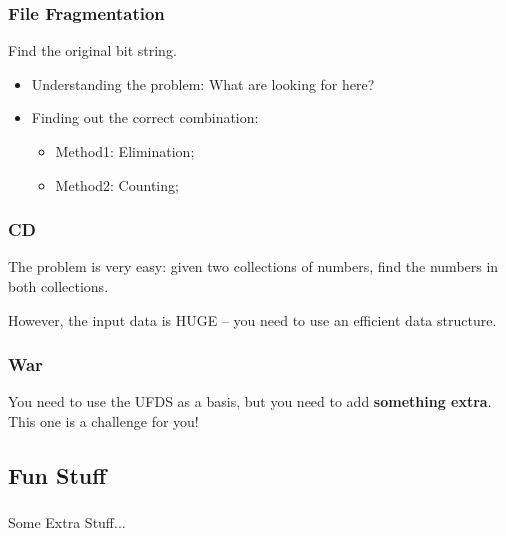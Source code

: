 \documentclass{beamer}
\begin{document}
\begin{frame}
  \frametitle{File Fragmentation}
  Find the original bit string.
  \begin{itemize}
  \item Understanding the problem: What are looking for here?
  \item Finding out the correct combination:
    \begin{itemize}
    \item Method1: Elimination;
    \item Method2: Counting;
    \end{itemize}
  \end{itemize}
\end{frame}

\begin{frame}
  \frametitle{CD}

  The problem is very easy: given two collections of numbers, find the
  numbers in both collections.

  \bigskip
  
  However, the input data is HUGE -- you need to use an efficient data
  structure.
\end{frame}

\begin{frame}
  \frametitle{War}

  You need to use the UFDS as a basis, but you need to add {\bf
    something extra}. This one is a challenge for you!
\end{frame}


\subsection{Fun Stuff}

\begin{frame}
  \frametitle{}

  Some Extra Stuff...
\end{frame}
\end{document}
